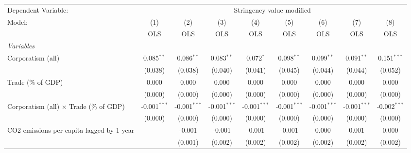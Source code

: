
\begingroup
\centering
\begin{tabular}{lcccccccc}
   \toprule
   Dependent Variable: & \multicolumn{8}{c}{Stringency value modified}\\
   Model:                                                     & (1)            & (2)            & (3)            & (4)            & (5)            & (6)            & (7)            & (8)\\  
                                                              &  OLS           & OLS            & OLS            & OLS            & OLS            & OLS            & OLS            & OLS\\  
   \midrule
   \emph{Variables}\\
   Corporatism (all)                                          & 0.085$^{**}$   & 0.086$^{**}$   & 0.083$^{**}$   & 0.072$^{*}$    & 0.098$^{**}$   & 0.099$^{**}$   & 0.091$^{**}$   & 0.151$^{***}$\\   
                                                              & (0.038)        & (0.038)        & (0.040)        & (0.041)        & (0.045)        & (0.044)        & (0.044)        & (0.052)\\   
   Trade (\% of GDP)                                          & 0.000          & 0.000          & 0.000          & 0.000          & 0.000          & 0.000          & 0.000          & 0.000\\   
                                                              & (0.000)        & (0.000)        & (0.000)        & (0.000)        & (0.000)        & (0.000)        & (0.000)        & (0.000)\\   
   Corporatism (all) $\times$ Trade (\% of GDP)               & -0.001$^{***}$ & -0.001$^{***}$ & -0.001$^{***}$ & -0.001$^{***}$ & -0.001$^{***}$ & -0.001$^{***}$ & -0.001$^{***}$ & -0.002$^{***}$\\   
                                                              & (0.000)        & (0.000)        & (0.000)        & (0.000)        & (0.000)        & (0.000)        & (0.000)        & (0.000)\\   
   CO2 emissions per capita lagged by 1 year                  &                & -0.001         & -0.001         & -0.001         & -0.001         & 0.000          & 0.001          & 0.000\\   
                                                              &                & (0.001)        & (0.002)        & (0.002)        & (0.002)        & (0.002)        & (0.002)        & (0.002)\\   

\end{tabular}

